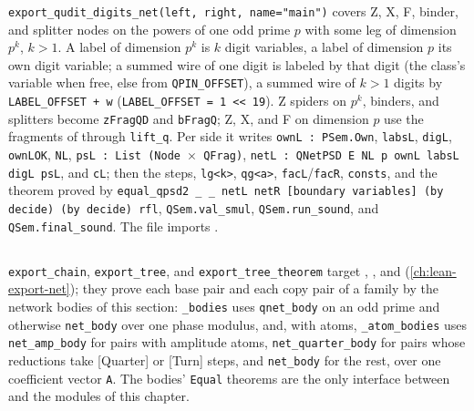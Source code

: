 \textnormal{\texttt{export\_\allowbreak{}qudit\_\allowbreak{}digits\_\allowbreak{}net(\allowbreak{}left,\allowbreak{} right,\allowbreak{} name="main")}} covers Z, X, F, binder, and splitter nodes on
the powers of one odd prime $p$ with some leg of dimension $p^k$, $k>1$. A label of dimension $p^k$
is $k$ digit variables, a label of dimension $p$ its own digit variable; a summed wire of one digit
is labeled by that digit (the class's variable when free, else from \textnormal{\texttt{QPIN\_\allowbreak{}OFFSET}}), a summed
wire of $k>1$ digits by \textnormal{\texttt{LABEL\_\allowbreak{}OFFSET + w}} (\textnormal{\texttt{LABEL\_\allowbreak{}OFFSET = 1 << 19}}). Z spiders on $p^k$,
binders, and splitters become \textnormal{\texttt{zFragQD}} and \textnormal{\texttt{bFragQ}}; Z, X, and F on dimension $p$ use
the fragments of  through \textnormal{\texttt{lift\_\allowbreak{}q}}. Per side it writes
\textnormal{\texttt{ownL : PSem.\allowbreak{}Own}}, \textnormal{\texttt{labsL}}, \textnormal{\texttt{digL}}, \textnormal{\texttt{ownLOK}}, \textnormal{\texttt{NL}},
\textnormal{\texttt{psL : List (\allowbreak{}Node \ensuremath{\times} QFrag)}}, \textnormal{\texttt{netL : QNetPSD E NL p ownL labsL digL psL}}, and \textnormal{\texttt{cL}};
then the steps, \textnormal{\texttt{lg<k>}}, \textnormal{\texttt{qg<a>}}, \textnormal{\texttt{facL}}/\textnormal{\texttt{facR}}, \textnormal{\texttt{consts}}, and the theorem
proved by \textnormal{\texttt{equal\_\allowbreak{}qpsd2 \_\allowbreak{} \_\allowbreak{} netL netR [boundary variables] (\allowbreak{}by decide) (\allowbreak{}by decide) rfl}},
\textnormal{\texttt{QSem.\allowbreak{}val\_\allowbreak{}smul}}, \textnormal{\texttt{QSem.\allowbreak{}run\_\allowbreak{}sound}}, and \textnormal{\texttt{QSem.\allowbreak{}final\_\allowbreak{}sound}}. The file imports
.

\subsection{\texorpdfstring{}{lean\_chain}}

\textnormal{\texttt{export\_\allowbreak{}chain}}, \textnormal{\texttt{export\_\allowbreak{}tree}}, and \textnormal{\texttt{export\_\allowbreak{}tree\_\allowbreak{}theorem}} target ,
, and  (\cref{ch:lean-export-net}); they prove each base pair and
each copy pair of a family by the network bodies of this section: \textnormal{\texttt{\_\allowbreak{}bodies}} uses
\textnormal{\texttt{qnet\_\allowbreak{}body}} on an odd prime and otherwise \textnormal{\texttt{net\_\allowbreak{}body}} over one phase modulus, and, with atoms,
\textnormal{\texttt{\_\allowbreak{}atom\_\allowbreak{}bodies}} uses \textnormal{\texttt{net\_\allowbreak{}amp\_\allowbreak{}body}} for pairs with amplitude atoms, \textnormal{\texttt{net\_\allowbreak{}quarter\_\allowbreak{}body}} for
pairs whose reductions take [Quarter] or [Turn] steps, and \textnormal{\texttt{net\_\allowbreak{}body}} for the rest, over one
coefficient vector \textnormal{\texttt{A}}. The bodies' \textnormal{\texttt{Equal}} theorems are the only interface between
 and the modules of this chapter.
\endgroup
